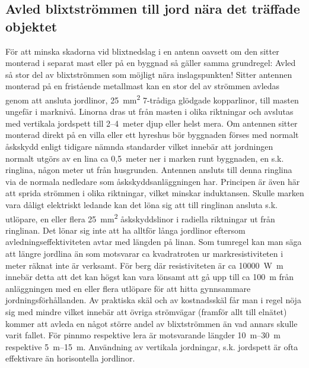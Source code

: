 \subsection{Avled blixtströmmen till jord nära det träffade objektet}
För att minska skadorna vid blixtnedslag i en antenn oavsett om den sitter
monterad i separat mast eller på en byggnad så gäller samma grundregel: Avled så
stor del av blixtströmmen som möjligt nära inslagspunkten!
Sitter antennen monterad på en fristående metallmast kan en stor del av strömmen
avledas genom att ansluta jordlinor, \qty{25}{\milli\metre\squared} 7-trådiga
glödgade kopparlinor, till masten ungefär i marknivå.
Linorna dras ut från masten i olika riktningar och avslutas med vertikala
jordspett till 2--4~meter djup eller helst mera.
Om antennen sitter monterad direkt på en villa eller ett hyreshus bör byggnaden
förses med normalt åskskydd enligt tidigare nämnda standarder vilket innebär att
jordningen normalt utgörs av en lina ca 0,5~meter ner i marken runt byggnaden,
en s.k. ringlina, någon meter ut från husgrunden.
Antennen ansluts till denna ringlina via de normala nedledare som
åskskyddsanläggningen har.
Principen är även här att sprida strömmen i olika riktningar, vilket minskar
induktansen.
Skulle marken vara dåligt elektriskt ledande kan det löna sig att till ringlinan
ansluta s.k. utlöpare, en eller flera \qty{25}{\milli\metre\squared}
åskskyddslinor i radiella riktningar ut från ringlinan.
Det lönar sig inte att ha alltför långa jordlinor eftersom
avledningseffektiviteten avtar med längden på linan.
Som tumregel kan man säga att längre jordlina än som motsvarar ca kvadratroten
ur markresistiviteten i meter räknat inte är verksamt.
För berg där resistiviteten är ca \qty{10000}{\watt\metre} innebär detta att det
kan högst kan vara lönsamt att gå upp till ca \qty{100}{\metre} från
anläggningen med en eller flera utlöpare för att hitta gynnsammare
jordningsförhållanden.
Av praktiska skäl och av kostnadsskäl får man i regel nöja sig med mindre vilket
innebär att övriga strömvägar (framför allt till elnätet) kommer att avleda en
något större andel av blixtströmmen än vad annars skulle varit fallet.
För pinnmo respektive lera är motsvarande längder \qtyrange{10}{30}{\metre}
respektive \qtyrange{5}{15}{\metre}.
Användning av vertikala jordningar, s.k. jordspett är ofta effektivare än
horisontella jordlinor.

